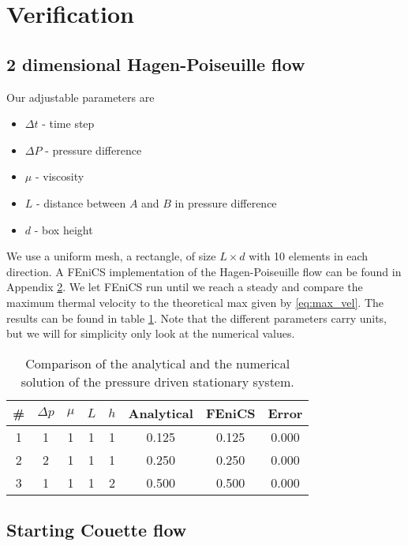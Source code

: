 \documentclass[a4paper,10pt]{article}
\renewcommand{\(}{\left(}
\renewcommand{\)}{\right)}
\begin{document}
\section{Verification}
\subsection{2 dimensional Hagen-Poiseuille flow}
Our adjustable parameters are
\begin{itemize}
\item $\Delta t$ - time step
\item $\Delta P$ - pressure difference
\item $\mu$ - viscosity
\item $L$ - distance between $A$ and $B$ in pressure difference
\item $d$ - box height
\end{itemize}
We use a uniform mesh, a rectangle, of size $L\times d$ with 10 elements in each direction. A FEniCS implementation of the Hagen-Poiseuille flow can be found in Appendix \ref{ap:a}. We let FEniCS run until we reach a steady and compare the maximum thermal velocity to the theoretical max given by \eqref{eq:max_vel}. The results can be found in table \ref{tab:res_hagen_poiseuille}. Note that the different parameters carry units, but we will for simplicity only look at the numerical values.

\begin{table}[h!]
  \begin{center}
    \begin{tabular}[width=4in]{|c|c|c|c|c|c|c|c|}
      \hline
      \# & $\Delta p$ & $\mu$ & $L$ & $h$ & Analytical & FEniCS & Error\\ \hline
      1 & 1 & 1 & 1 & 1 & 0.125 & 0.125 & 0.000\\
      2 & 2 & 1 & 1 & 1 & 0.250 & 0.250 & 0.000\\
      3 & 1 & 1 & 1 & 2 & 0.500 & 0.500 & 0.000\\
      \hline
    \end{tabular}
  \caption{Comparison of the analytical and the numerical solution of the pressure driven stationary system.}
  \label{tab:res_hagen_poiseuille}
  \end{center}
\end{table}

\begin{appendices}
  \gdef\thesection{Appendix \Alph{section}}
  \section{Starting Couette flow}
  \label{ap:a}
  
  
\end{appendices}


\printbibliography
\end{document}
